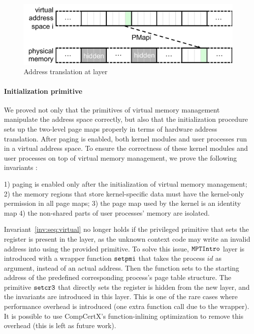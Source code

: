 \begin{figure}[t]\centering
\includegraphics[scale=.55]{figs/mem_model_2} 
\caption{Address translation at  layer}
\label{fig:seq:mem2}
\hrulefill
\end{figure}

\paragraph{Initialization primitive}
We proved not only that the primitives of virtual memory management
manipulate the address space correctly,
but also that the initialization procedure sets up the two-level page maps properly
in terms of hardware address translation.
After paging is enabled, both kernel modules and user processes
run in a virtual address space.
To ensure the correctness of these kernel modules and user processes on top of virtual memory
management, we prove the following invariants :
\begin{invariant}
\label{inv:seq:virtual}
1) paging is enabled only after the initialization of virtual memory management;
2) the memory regions that store kernel-specific data must have the kernel-only 
permission in all page maps;
3) the page map used by the kernel is an identity map
4) the non-shared parts of user processes' memory are isolated.
\end{invariant}

Invariant~\ref{inv:seq:virtual} no longer holds 
if the privileged primitive that sets the 
register is present in the layer, as the unknown context code may write
an invalid address into  using the provided primitive. To solve this issue, 
${\texttt{MPTIntro}}$
layer is introduced with a wrapper function 
${\texttt{setpmi}}$
that takes the process $id$ as argument,
instead of an actual address. Then the function sets  to the
starting address of the predefined corresponding process's page table structure.
The primitive ${\texttt{setcr3}}$ that directly sets the  register is hidden from the
new layer, and the invariants are introduced in this layer.
This is one of the rare cases where performance overhead is introduced
(one extra function call due to the wrapper).
It is possible to use CompCertX's function-inlining optimization
to remove this overhead (this is left as future work).

